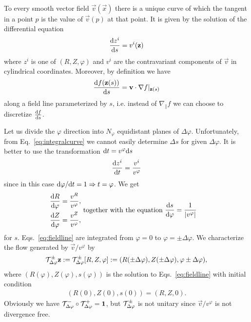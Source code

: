 To every smooth vector field $\vec v(\vec x)$ there is a unique curve of which the
tangent in a point $p$ is the value of $\vec v(p)$ at that point. It is given by
the solution of the differential equation
\begin{align}
    \frac{\mathrm{d} z^i}{\mathrm{d} s} = v^i({\mathbf{z}})
    \label{eq:integralcurve}
\end{align}
where $z^i$ is one of $(R, Z, \varphi)$ and $v^i$ are the contravariant components
of $\vec v$ in cylindrical coordinates. 
Moreover, by definition we have
\begin{align}
    \frac{\mathrm{d} f({\mathbf{z}}(s))}{\mathrm{d} s} = {\mathbf{v}}\cdot \nabla f|_{{\mathbf{z}}(s)}
    \label{}
\end{align}
along a field line parameterized by $s$, 
i.e. instead of $\nabla_\parallel f$ we can choose to discretize $\frac{\mathrm{d} f}{\mathrm{d} s}$.

Let us divide the $\varphi$ direction into $N_\varphi$ equidistant planes of 
$\Delta \varphi$. Unfortunately, from Eq.~\eqref{eq:integralcurve} we cannot easily determine
$\Delta s$ for given $\Delta \varphi$. It is better to use the transformation $\mathrm{d} t = v^\varphi \mathrm{d} s$
\begin{align}
    \frac{\mathrm{d} z^i}{\mathrm{d} t} = \frac{v^i}{v^\varphi}
    \label{}
\end{align}
since in this case $\mathrm{d}\varphi/\mathrm{d} t = 1 \Rightarrow t=\varphi$. We get
\begin{subequations}
\begin{align}
    \frac{\d R}{\d\varphi}&= \frac{v^R}{v^\varphi},\\ %
    \frac{\d Z}{\d\varphi}&=\frac{v^Z}{v^\varphi},%
\end{align}
\text{ together with the equation  }
\begin{align}
    \frac{\d s}{\d\varphi} &= \frac{1}{|v^\varphi|} %
    \label{eq:fieldlinec}
\end{align}
\label{eq:fieldline}
\end{subequations}
for $s$. 
Eqs.~\eqref{eq:fieldline} are integrated from $\varphi=0$ to $\varphi=\pm \Delta \varphi$. 
We characterize the flow generated by $\vec v/v^\varphi$ by
\begin{align}
    \mathcal T^\pm_{\Delta\varphi}{\mathbf{z}} := \mathcal T^\pm_{\Delta\varphi}[R, Z, \varphi]:= ( R(\pm \Delta\varphi), Z( \pm \Delta\varphi), \varphi\pm\Delta \varphi),
    \label{}
\end{align}
where $(R(\varphi), Z(\varphi), s(\varphi))$ is the solution to Eqs.~\eqref{eq:fieldline} 
with initial condition 
\begin{align}
    (R(0), Z(0), s(0)) = (R, Z, 0).
    \label{}
\end{align} 
Obviously we have $\mathcal T^-_{\Delta\varphi}\circ\mathcal T^+_{\Delta\varphi} = \mathbf{1}$, but $\mathcal T^\pm_{\Delta\varphi}$ is not unitary since $\vec v/v^\varphi$ is 
not divergence free. 

